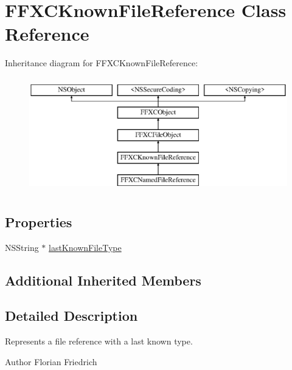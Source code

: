 \hypertarget{interface_f_f_x_c_known_file_reference}{\section{F\-F\-X\-C\-Known\-File\-Reference Class Reference}
\label{interface_f_f_x_c_known_file_reference}
}
Inheritance diagram for F\-F\-X\-C\-Known\-File\-Reference\-:\begin{figure}[H]
\begin{center}
\leavevmode
\includegraphics[height=5.000000cm]{interface_f_f_x_c_known_file_reference}
\end{center}
\end{figure}
\subsection*{Properties}
\begin{DoxyCompactItemize}
\item 
N\-S\-String $\ast$ \hyperlink{interface_f_f_x_c_known_file_reference_a52fb7d9158293b6d026617ce0093fc5a}{last\-Known\-File\-Type}
\end{DoxyCompactItemize}
\subsection*{Additional Inherited Members}


\subsection{Detailed Description}
Represents a file reference with a last known type. \begin{DoxyAuthor}{Author}
Florian Friedrich 
\end{DoxyAuthor}


